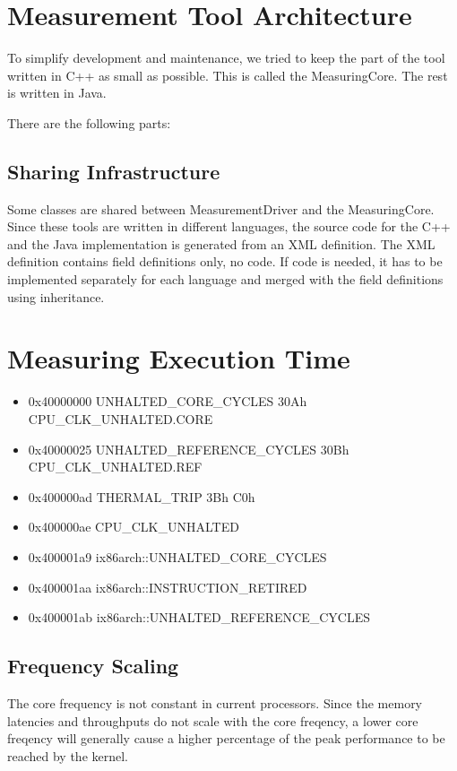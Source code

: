 \documentclass[a4paper,12pt]{article}
\begin{document}
\section{Measurement Tool Architecture}
To simplify development and maintenance, we tried to keep the part of the tool written in C++ as small as possible. This is called the MeasuringCore. The rest is written in Java.

There are the following parts:
\begin{itemize}
\end{itemize}

\subsection{Sharing Infrastructure}
Some classes are shared between MeasurementDriver and the MeasuringCore. Since these tools are written in different languages, the source code for the C++ and the Java implementation is generated from an XML definition. The XML definition contains field definitions only, no code. If code is needed, it has to be implemented separately for each language and merged with the field definitions using inheritance.

\section{Measuring Execution Time}
\begin{itemize}
\item 0x40000000   UNHALTED_CORE_CYCLES 30Ah CPU_CLK_UNHALTED.CORE
\item 0x40000025   UNHALTED_REFERENCE_CYCLES 30Bh CPU_CLK_UNHALTED.REF
\item 0x400000ad   THERMAL_TRIP 3Bh C0h 
\item 0x400000ae   CPU_CLK_UNHALTED
\item 0x400001a9   ix86arch::UNHALTED_CORE_CYCLES
\item 0x400001aa   ix86arch::INSTRUCTION_RETIRED
\item 0x400001ab   ix86arch::UNHALTED_REFERENCE_CYCLES 
\end{itemize}
\subsection{Frequency Scaling}
The core frequency is not constant in current processors. Since the memory latencies and throughputs do not scale with the core freqency, a lower core freqency will generally cause a higher percentage of the peak performance to be reached by the kernel.
\end{document}
